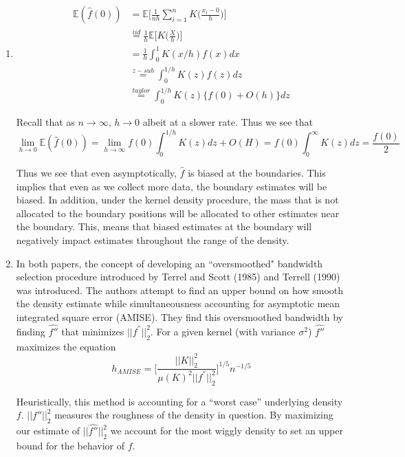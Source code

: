 \documentclass[12pt]{article}  %
\newcommand{\E}{{\mathbb{E}}}
\begin{document}
\begin{enumerate}
\item 
\begin{align*}
\E(\widehat{f}(0)) & = \E\Big[\frac{1}{nh}\sum_{i = 1}^{n}K\big(\frac{x_i - 0}{h}\big)\Big]\\
&\overset{iid}{=} \frac{1}{h}\E\Big[K\big(\frac{X}{h}\big)\Big]\\
&= \frac{1}{h}\int_{0}^{1}K(x/h)f(x)dx\\
&\overset{z-sub}{=} \int_{0}^{1/h}K(z)f(z)dz\\
&\overset{taylor}{=} \int_{0}^{1/h}K(z)\Big\{f(0) + O(h)\Big\}dz
\end{align*}

Recall that as $n\to\infty$, $h\to 0$ albeit at a slower rate. Thus we see that $$\lim_{h\to 0}\E(\widehat{f}(0))= \lim_{h\to\infty}f(0)\int_{0}^{1/h}K(z)dz + O(H) = f(0)\int_{0}^{\infty}K(z)dz = \frac{f(0)}{2}$$

Thus we see that even asymptotically, $\hat{f}$ is biased at the boundaries. This implies that even as we collect more data, the boundary estimates will be biased. In addition, under the kernel density procedure, the mass that is not allocated to the boundary positions will be allocated to other estimates near the boundary. This, means that biased estimates at the boundary will negatively impact estimates throughout the range of the density. 

\item In both papers, the concept of developing an ``oversmoothed" bandwidth selection procedure introduced by Terrel and Scott (1985) and Terrell (1990) was introduced. The authors attempt to find an upper bound on how smooth the density estimate while simultaneousness accounting for asymptotic mean integrated square error (AMISE). They find this oversmoothed bandwidth by finding $\hat{f''}$ that minimizes $||f^{''}||_2^2$. For a given kernel (with variance $\sigma^2$) $\hat{f''}$maximizes the equation 
$$h_{AMISE} = \Big[\frac{||K||_2^2}{\mu(K)^2||f^{''}||_2^2}\Big]^{1/5}n^{-1/5}$$ 

Heuristically, this method is accounting for a ``worst case'' underlying density $f$. $||f''||_2^2$ measures the roughness of the density in question. By maximizing our estimate of $||\hat{f''}||_2^2$ we account for the most wiggly density to set an upper bound for the behavior of $f$. 


\end{enumerate}
\end{document}
